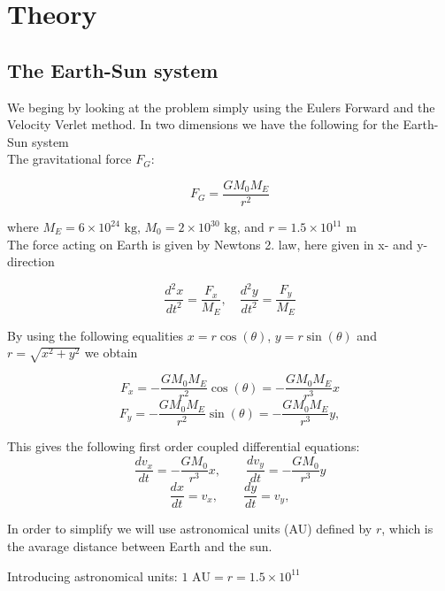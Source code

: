 \documentclass[../main.tex]{subfiles}
\begin{document}
\section{Theory}\label{theory}
\subsection{The Earth-Sun system}
We beging by looking at the problem simply using the Eulers Forward and the Velocity Verlet method.
In two dimensions we have the following for the Earth-Sun system \\

The gravitational force $F_G$:

\begin{equation}
  F_G= \frac{GM_0M_E}{r^2}
\end{equation}

where $M_E = 6\times 10^{24}\text{ kg}$,  $ M_0 = 2\times 10^{30}\text{ kg}$, and  $r = 1.5\times 10^{11}\text{ m}$\\ 
The force acting on Earth is given by Newtons 2. law, here given in x- and y- direction

$$ \frac{d^2x}{dt^2} = \frac{F_x}{M_E}, \quad \frac{d^2y}{dt^2} = \frac{F_y}{M_E}$$

By using the following equalities $x = r \cos(\theta)$,  $y = r\sin(\theta)$ and $r = \sqrt{x^2 +y^2}$ we obtain

\begin{equation}
  F_x = - \frac{GM_0M_E}{r^2} \cos(\theta) =- \frac{GM_0M_E}{r^3}x
\end{equation}
\begin{equation}
  F_y = - \frac{GM_0M_E}{r^2}\sin(\theta) =- \frac{GM_0M_E}{r^3}y,
\end{equation}

This gives the following first order  coupled differential equations:
\begin{equation}
  \frac{dv_x}{dt} = - \frac{GM_0}{r^3}x,\qquad \frac{dv_y}{dt} = - \frac{GM_0}{r^3}y
\end{equation}
\begin{equation}
  \frac{dx}{dt} = v_x,\qquad \frac{dy}{dt} = v_y,
\end{equation}

In order to simplify we will use astronomical units (AU) defined by $r$, which is the avarage distance between Earth and the sun.

Introducing astronomical units: $1\text{ AU}= r = 1.5 \times 10^{11}$
\end{document}
